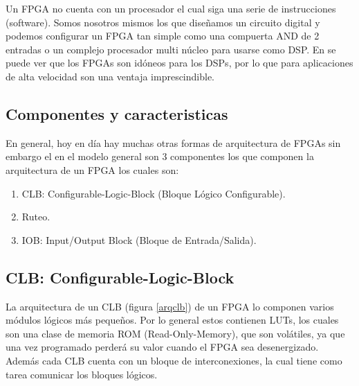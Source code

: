 \documentclass[twoside,spanish,ESP,MSc]{plantillaLabUPV}
\theoremstyle{definition}
\newcommand{\f}{FPGA }
\newcommand{\fs}{FPGAs }
\begin{document}
Un \f no cuenta con un procesador el cual siga una serie de instrucciones (software). Somos nosotros mismos los que diseñamos un circuito digital y podemos configurar un \f tan simple como una compuerta AND de 2 entradas o un complejo procesador multi núcleo para usarse como DSP. En \cite{bajaj} se puede ver que los \fs son idóneos para los DSPs, por lo que para aplicaciones de alta velocidad son una ventaja imprescindible.\\


\subsection{Componentes y caracteristicas}

En general, hoy en día hay muchas otras formas de arquitectura de FPGAs sin embargo el en el modelo general son 3 componentes los que componen la arquitectura de un \f los cuales son:

\begin{enumerate}
\item CLB: Configurable-Logic-Block (Bloque Lógico Configurable).
\item Ruteo.
\item IOB: Input/Output Block (Bloque de Entrada/Salida).\\
\end{enumerate} 

\subsection*{CLB: Configurable-Logic-Block}

La arquitectura de un CLB (figura \ref{arqclb}) de un \f lo componen varios módulos lógicos más pequeños. Por lo general estos contienen LUTs, los cuales son una clase de memoria ROM (Read-Only-Memory), que son volátiles, ya que una vez programado perderá su valor cuando el \f sea desenergizado. Además cada CLB cuenta con un bloque de interconexiones, la cual tiene como tarea comunicar los bloques lógicos.\\
\end{document}
